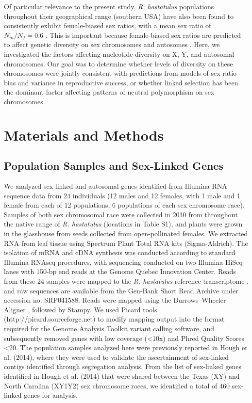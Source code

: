 \documentclass[9pt,twocolumn,twoside]{gsajnl}
\begin{document}
Of particular relevance to the present study, \textit{R. hastatulus} populations throughout their geographical range (southern USA) have also been found to consistently exhibit female-biased sex ratios, with a mean sex ratio of $N_{m}/N_{f}=0.6$ \citep{pickup2013influence}. This is important because female-biased sex ratios are predicted to affect genetic diversity on sex chromosomes and autosomes \citep{ellegren2009}. Here, we investigated the factors affecting nucleotide diversity on X, Y, and autosomal chromosomes. Our goal was to determine whether levels of diversity on these chromosomes were jointly consistent with predictions from models of sex ratio bias and variance in reproductive success, or whether linked selection has been the dominant factor affecting patterns of neutral polymorphism on sex chromosomes.

\section*{Materials and Methods}
\subsection*{Population Samples and Sex-Linked Genes}
We analyzed sex-linked and autosomal genes identified from Illumina RNA sequence data from 24 individuals (12 males and 12 females, with 1 male and 1 female from each of 12 populations, 6 populations of each sex chromosome race). Samples of both sex chromosomal race were collected in 2010 from throughout the native range of \textit{R. hastatulus} (locations in Table S1), and plants were grown in the glasshouse from seeds collected from open-pollinated females. We extracted RNA from leaf tissue using Spectrum Plant Total RNA kits (Sigma-Aldrich). The isolation of mRNA and cDNA synthesis was conducted according to standard Illumina RNAseq procedures, with sequencing conducted on two Illumina HiSeq lanes with 150-bp end reads at the Genome Quebec Innovation Center. Reads from these 24 samples were mapped to the \textit{R. hastatulus} reference transcriptome \citep{hough2014}, and raw sequences are available from the Gen-Bank Short Read Archive under accession no. SRP041588. Reads were mapped using the Burrows–Wheeler Aligner \citep{li2010fast}, followed by Stampy\citep{lunter2011stampy}. We used Picard tools (http://picard.sourceforge.net) to modify mapping output into the format required for the Genome Analysis Toolkit \citep{mckenna2010genome} variant calling software, and subsequently removed genes with low coverage (<10x) and Phred Quality Scores <20. The population samples analyzed here were previously reported in Hough et al. (2014), where they were used to validate the ascertainment of sex-linked contigs identified through segregation analysis. From the list of sex-linked genes identified in Hough et al. (2014) that were shared between the Texas (XY) and North Carolina (XY1Y2) sex chromosome races, we identified a total of 460 sex-linked genes for analysis.
\end{document}
